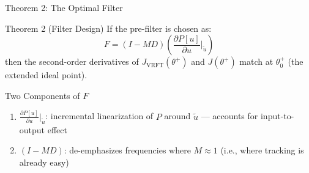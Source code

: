\documentclass[hyperref={pdfpagemode=FullScreen},aspectratio=169]{beamer}
\newcommand{\JJ}{J_{\mathrm{VRFT}}}
\newcommand{\Jopt}{J}
\begin{document}
\begin{frame}{Theorem 2: The Optimal Filter}
      \begin{block}{Theorem 2 (Filter Design)}
        If the pre-filter is chosen as:
        \[
          \boxed{F = (I - MD)\left(\frac{\partial P[u]}{\partial u}\bigg|_{\tilde{u}}\right)}
        \]
        then the second-order derivatives of $\JJ(\theta^+)$ and $\Jopt(\theta^+)$ match at $\theta^+_0$ (the extended ideal point).
      \end{block}
      \vspace{0.4em}
      \begin{block}{Two Components of $F$}
        \begin{enumerate}
          \item $\displaystyle\frac{\partial P[u]}{\partial u}\Big|_{\tilde{u}}$: incremental linearization of $P$ around $\tilde{u}$ --- accounts for input-to-output effect
          \item $(I - MD)$: de-emphasizes frequencies where $M \approx 1$ (i.e., where tracking is already easy)
        \end{enumerate}
      \end{block}

\end{frame}
\end{document}
